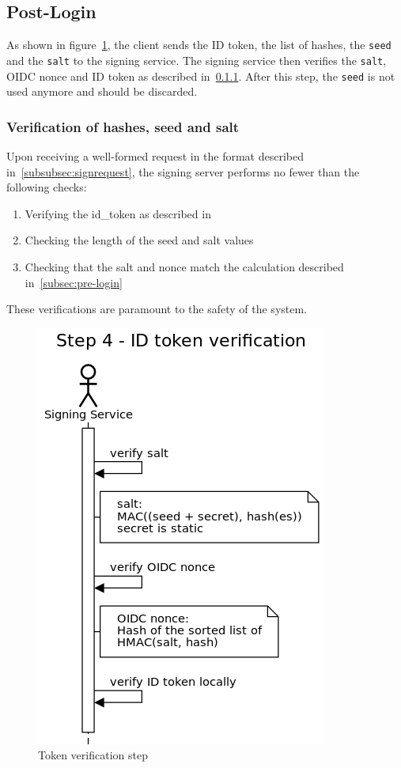 \subsection{Post-Login}\label{subsec:post-login}
As shown in figure~\ref{fig:tokenverificationstep},
the client sends the ID token, the list of hashes, the \texttt{seed} and the \texttt{salt} to the signing service.
The signing service then verifies the \texttt{salt}, OIDC nonce and ID token as described in~\ref{subsubsec:verificationhashesseedsalt}.
After this step, the \texttt{seed} is not used anymore and should be discarded.


\subsubsection{Verification of hashes, seed and salt}\label{subsubsec:verificationhashesseedsalt}
Upon receiving a well-formed request in the format described in~\ref{subsubsec:signrequest},
the signing server performs no fewer than the following checks:
\begin{enumerate}
	\item Verifying the id\_token as described in~\cite[Section~7.2]{rfc7519}
	\item Checking the length of the seed and salt values
	\item Checking that the salt and nonce match the calculation described in~\ref{subsec:pre-login}
\end{enumerate}
These verifications are paramount to the safety of the system.

\begin{figure}
	\begin{center}
		\includegraphics[scale=0.5]{images/protocol_step4_id_token_verification.png}
		\caption{Token verification step}
		\label{fig:tokenverificationstep}
	\end{center}
\end{figure}

